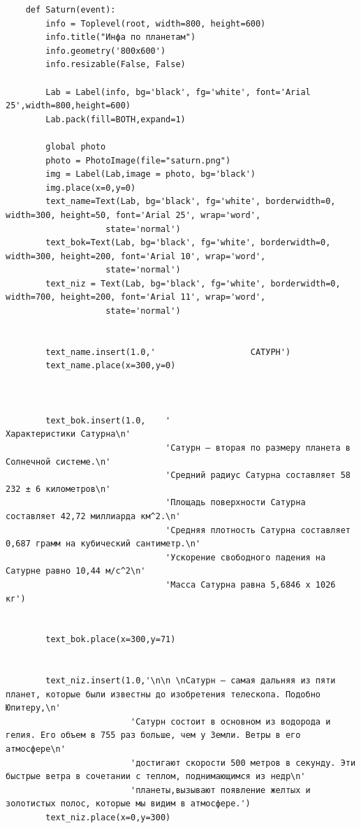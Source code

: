 \documentclass[11pt,a4paper]{report}
\begin{document}
\begin{verbatim}
    def Saturn(event): 
        info = Toplevel(root, width=800, height=600)
        info.title("Инфа по планетам")
        info.geometry('800x600')
        info.resizable(False, False) 
        
        Lab = Label(info, bg='black', fg='white', font='Arial 25',width=800,height=600)  
        Lab.pack(fill=BOTH,expand=1)
        
        global photo
        photo = PhotoImage(file="saturn.png")
        img = Label(Lab,image = photo, bg='black')
        img.place(x=0,y=0)
        text_name=Text(Lab, bg='black', fg='white', borderwidth=0, width=300, height=50, font='Arial 25', wrap='word',
                    state='normal')  
        text_bok=Text(Lab, bg='black', fg='white', borderwidth=0, width=300, height=200, font='Arial 10', wrap='word',
                    state='normal')  
        text_niz = Text(Lab, bg='black', fg='white', borderwidth=0, width=700, height=200, font='Arial 11', wrap='word',
                    state='normal')  
    
       
        text_name.insert(1.0,'                   САТУРН')
        text_name.place(x=300,y=0)
        
        
        
        text_bok.insert(1.0,    '                                           Характеристики Сатурна\n' 
                                'Сатурн – вторая по размеру планета в Солнечной системе.\n'
                                'Средний радиус Сатурна составляет 58 232 ± 6 километров\n'
                                'Площадь поверхности Сатурна составляет 42,72 миллиарда км^2.\n'
                                'Средняя плотность Сатурна составляет 0,687 грамм на кубический сантиметр.\n'
                                'Ускорение свободного падения на Сатурне равно 10,44 м/c^2\n'
                                'Масса Сатурна равна 5,6846 х 1026 кг')
        
        
        text_bok.place(x=300,y=71)        
        
        
        text_niz.insert(1.0,'\n\n \nСатурн — самая дальняя из пяти планет, которые были известны до изобретения телескопа. Подобно Юпитеру,\n'
                         'Сатурн состоит в основном из водорода и гелия. Его объем в 755 раз больше, чем у Земли. Ветры в его атмосфере\n'
                         'достигают скорости 500 метров в секунду. Эти быстрые ветра в сочетании с теплом, поднимающимся из недр\n' 
                         'планеты,вызывают появление желтых и золотистых полос, которые мы видим в атмосфере.')
        text_niz.place(x=0,y=300)
        

\end{verbatim}
\end{document}
